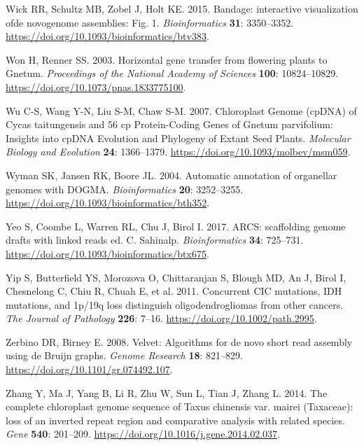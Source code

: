 \documentclass[
  12pt,
  oneside,
  openany]{book}
\begin{document}
\leavevmode\hypertarget{ref-Wick_2015}{}%
Wick RR, Schultz MB, Zobel J, Holt KE. 2015. Bandage: interactive visualization ofde novogenome assemblies: Fig. 1. \emph{Bioinformatics} \textbf{31}: 3350--3352. \url{https://doi.org/10.1093/bioinformatics/btv383}.

\leavevmode\hypertarget{ref-Won_2003}{}%
Won H, Renner SS. 2003. Horizontal gene transfer from flowering plants to Gnetum. \emph{Proceedings of the National Academy of Sciences} \textbf{100}: 10824--10829. \url{https://doi.org/10.1073/pnas.1833775100}.

\leavevmode\hypertarget{ref-Wu_2007}{}%
Wu C-S, Wang Y-N, Liu S-M, Chaw S-M. 2007. Chloroplast Genome (cpDNA) of Cycas taitungensis and 56 cp Protein-Coding Genes of Gnetum parvifolium: Insights into cpDNA Evolution and Phylogeny of Extant Seed Plants. \emph{Molecular Biology and Evolution} \textbf{24}: 1366--1379. \url{https://doi.org/10.1093/molbev/msm059}.

\leavevmode\hypertarget{ref-Wyman_2004}{}%
Wyman SK, Jansen RK, Boore JL. 2004. Automatic annotation of organellar genomes with DOGMA. \emph{Bioinformatics} \textbf{20}: 3252--3255. \url{https://doi.org/10.1093/bioinformatics/bth352}.

\leavevmode\hypertarget{ref-Yeo_2017}{}%
Yeo S, Coombe L, Warren RL, Chu J, Birol I. 2017. ARCS: scaffolding genome drafts with linked reads ed. C. Sahinalp. \emph{Bioinformatics} \textbf{34}: 725--731. \url{https://doi.org/10.1093/bioinformatics/btx675}.

\leavevmode\hypertarget{ref-Yip_2011}{}%
Yip S, Butterfield YS, Morozova O, Chittaranjan S, Blough MD, An J, Birol I, Chesnelong C, Chiu R, Chuah E, et al. 2011. Concurrent CIC mutations, IDH mutations, and 1p/19q loss distinguish oligodendrogliomas from other cancers. \emph{The Journal of Pathology} \textbf{226}: 7--16. \url{https://doi.org/10.1002/path.2995}.

\leavevmode\hypertarget{ref-Zerbino_2008}{}%
Zerbino DR, Birney E. 2008. Velvet: Algorithms for de novo short read assembly using de Bruijn graphs. \emph{Genome Research} \textbf{18}: 821--829. \url{https://doi.org/10.1101/gr.074492.107}.

\leavevmode\hypertarget{ref-Zhang_2014}{}%
Zhang Y, Ma J, Yang B, Li R, Zhu W, Sun L, Tian J, Zhang L. 2014. The complete chloroplast genome sequence of Taxus chinensis var. mairei (Taxaceae): loss of an inverted repeat region and comparative analysis with related species. \emph{Gene} \textbf{540}: 201--209. \url{https://doi.org/10.1016/j.gene.2014.02.037}.
\end{document}
